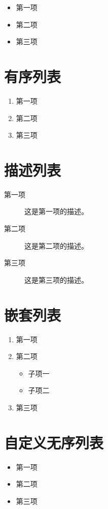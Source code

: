 \documentclass[a4paper, UTF-8,14pt]{ctexart}
\begin{document}
	\begin{itemize}
		\item 第一项
		\item 第二项
		\item 第三项
	\end{itemize}
	
	\section*{有序列表}
	\begin{enumerate}
		\item 第一项
		\item 第二项
		\item 第三项
	\end{enumerate}
	
	\section*{描述列表}
	\begin{description}
		\item[第一项] 这是第一项的描述。
		\item[第二项] 这是第二项的描述。
		\item[第三项] 这是第三项的描述。
	\end{description}
	
	\section*{嵌套列表}
	\begin{enumerate}
		\item 第一项
		\item 第二项
		\begin{itemize}
			\item 子项一
			\item 子项二
		\end{itemize}
		\item 第三项
	\end{enumerate}
	
	\section*{自定义无序列表}
	\begin{itemize}[label=\textbullet] %
		\item 第一项
		\item 第二项
		\item 第三项
	\end{itemize}
	
\end{document}
